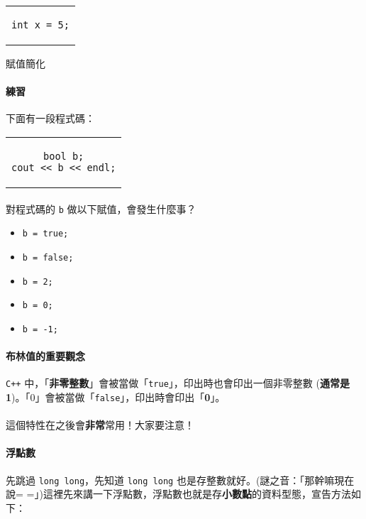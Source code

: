 \documentclass[12pt,a4paper,oneside]{article}
\begin{document}
\begin{CJK}{UTF8}{bkai}
\begin{code}[h!]
\centering
\begin{tabular}{c}
\begin{lstlisting}
int x = 5;
\end{lstlisting}
\end{tabular}
\caption{賦值簡化}
\label{basic:cpp:code:assignment:simple}
\end{code}

\paragraph{練習}下面有一段程式碼：

\begin{code}[h!]
\centering
\begin{tabular}{c}
\begin{lstlisting}
bool b;
cout << b << endl;
\end{lstlisting}
\end{tabular}
\label{basic:cpp:code:practice:bool}
\end{code}

\paragraph{}對程式碼的 \lstinline!b! 做以下賦值，會發生什麼事？
\begin{itemize}
\item \lstinline!b = true;!
\item \lstinline!b = false;!
\item \lstinline!b = 2;!
\item \lstinline!b = 0;!
\item \lstinline!b = -1;!
\end{itemize}
  
\paragraph{布林值的重要觀念}\texttt{C++} 中，「\textbf{非零整數}」會被當做「\lstinline!true!」，印出時也會印出一個非零整數 (\textbf{通常是 1})。「0」會被當做「\lstinline!false!」，印出時會印出「\textbf{0}」。
\paragraph{}這個特性在之後會\textbf{非常}常用！大家要注意！

\paragraph{浮點數}先跳過 \lstinline!long long!，先知道 \lstinline!long long! 也是存整數就好。(謎之音：「那幹嘛現在說= =」)這裡先來講一下浮點數，浮點數也就是存\textbf{小數點}的資料型態，宣告方法如下：


\end{CJK}
\end{document}
